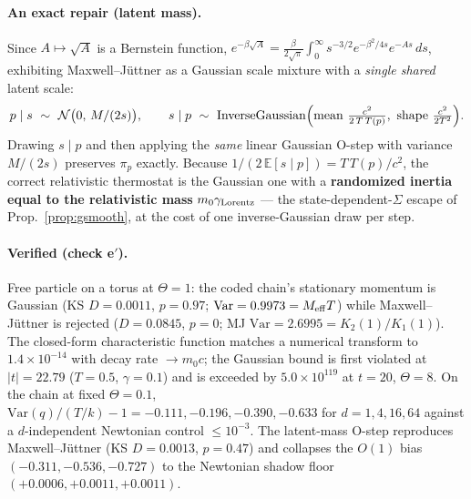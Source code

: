 \documentclass[11pt]{article}
\theoremstyle{plain}
\theoremstyle{definition}
\begin{document}
\paragraph{An exact repair (latent mass).} Since $A\mapsto\sqrt A$ is a Bernstein function, $e^{-\beta\sqrt A}=\frac{\beta}{2\sqrt\pi}\int_0^\infty s^{-3/2}e^{-\beta^2/4s}e^{-As}\,ds$, exhibiting Maxwell--J\"uttner as a Gaussian scale mixture with a \emph{single shared} latent scale:
\[ p\mid s\ \sim\ \mathcal N\bigl(0,\,M/(2s)\bigr),\qquad s\mid p\ \sim\ \mathrm{InverseGaussian}\Bigl(\text{mean }\tfrac{c^2}{2\,T\,T(p)},\ \text{shape }\tfrac{c^2}{2T^2}\Bigr). \]
Drawing $s\mid p$ and then applying the \emph{same} linear Gaussian O-step with variance $M/(2s)$ preserves $\pi_p$ exactly. Because $1/(2\,\mathbb E[s\mid p])=T\,T(p)/c^2$, the correct relativistic thermostat is the Gaussian one with a \textbf{randomized inertia equal to the relativistic mass} $m_0\gamma_{\rm Lorentz}$ --- the state-dependent-$\Sigma$ escape of Prop.~\ref{prop:gsmooth}, at the cost of one inverse-Gaussian draw per step.

\paragraph{Verified (check e$'$).} Free particle on a torus at $\Theta=1$: the coded chain's stationary momentum is Gaussian (KS $D=0.0011$, $p=0.97$; $\mathrm{Var}=0.9973=M_{\rm eff}T$) while Maxwell--J\"uttner is rejected ($D=0.0845$, $p=0$; MJ $\mathrm{Var}=2.6995=K_2(1)/K_1(1)$). The closed-form characteristic function matches a numerical transform to $1.4\times10^{-14}$ with decay rate $\to m_0c$; the Gaussian bound is first violated at $\lvert t\rvert=22.79$ ($T{=}0.5$, $\gamma{=}0.1$) and is exceeded by $5.0\times10^{119}$ at $t=20$, $\Theta=8$. On the chain at fixed $\Theta=0.1$, $\mathrm{Var}(q)/(T/k)-1=-0.111,-0.196,-0.390,-0.633$ for $d=1,4,16,64$ against a $d$-independent Newtonian control $\le10^{-3}$. The latent-mass O-step reproduces Maxwell--J\"uttner (KS $D=0.0013$, $p=0.47$) and collapses the $O(1)$ bias $(-0.311,-0.536,-0.727)$ to the Newtonian shadow floor $(+0.0006,+0.0011,+0.0011)$.
\end{document}
